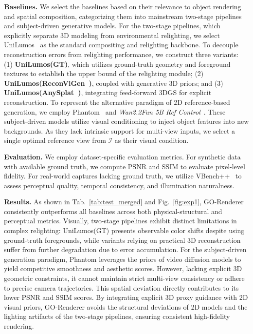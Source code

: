 \documentclass[runningheads]{llncs}
\newcommand{\methodname}{GO-Renderer\xspace}
\begin{document}
\textbf{Baselines.} We select the baselines based on their relevance to object rendering and spatial composition, categorizing them into mainstream two-stage pipelines and subject-driven generative models. For the two-stage pipelines, which explicitly separate 3D modeling from environmental relighting, we select UniLumos~\cite{unilumos} as the standard compositing and relighting backbone. To decouple reconstruction errors from relighting performance, we construct three variants: (1) \textbf{UniLumos(GT)}, which utilizes ground-truth geometry and foreground textures to establish the upper bound of the relighting module; (2) \textbf{UniLumos(ReconViGen~\cite{reconviagen})}, coupled with generative 3D priors; and (3) \textbf{UniLumos(AnySplat~\cite{anysplat})}, integrating feed-forward 3DGS for explicit reconstruction. To represent the alternative paradigm of 2D reference-based generation, we employ Phantom~\cite{phantom} and \textit{Wan2.2Fun 5B Ref Control}~\cite{videoxfun}. These subject-driven models utilize visual conditioning to inject object features into new backgrounds. As they lack intrinsic support for multi-view inputs, we select a single optimal reference view from $\mathcal{I}$ as their visual condition.

\textbf{Evaluation.} We employ dataset-specific evaluation metrics. For synthetic data with available ground truth, we compute PSNR and SSIM to evaluate pixel-level fidelity. For real-world captures lacking ground truth, we utilize VBench++~\cite{vbench} to assess perceptual quality, temporal consistency, and illumination naturalness.

\textbf{Results.} As shown in Tab.~\ref{tab:test_merged} and Fig.~\ref{fig:exp1}, \methodname consistently outperforms all baselines across both physical-structural and perceptual metrics. 
Visually, two-stage pipelines exhibit distinct limitations in complex relighting: UniLumos(GT) presents observable color shifts despite using ground-truth foregrounds, while variants relying on practical 3D reconstruction suffer from further degradation due to error accumulation. 
For the subject-driven generation paradigm, Phantom leverages the priors of video diffusion models to yield competitive smoothness and aesthetic scores. However, lacking explicit 3D geometric constraints, it cannot maintain strict multi-view consistency or adhere to precise camera trajectories. This spatial deviation directly contributes to its lower PSNR and SSIM scores. By integrating explicit 3D proxy guidance with 2D visual priors, \methodname avoids the structural deviations of 2D models and the lighting artifacts of the two-stage pipelines, ensuring consistent high-fidelity rendering.
\end{document}
